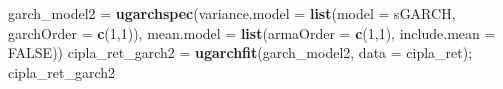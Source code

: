 \documentclass[
]{article}
\newenvironment{Shaded}{\begin{snugshade}}{\end{snugshade}}
\newcommand{\AttributeTok}[1]{\textcolor[rgb]{0.13,0.29,0.53}{#1}}
\newcommand{\ConstantTok}[1]{\textcolor[rgb]{0.56,0.35,0.01}{#1}}
\newcommand{\DecValTok}[1]{\textcolor[rgb]{0.00,0.00,0.81}{#1}}
\newcommand{\FunctionTok}[1]{\textcolor[rgb]{0.13,0.29,0.53}{\textbf{#1}}}
\newcommand{\NormalTok}[1]{#1}
\newcommand{\OtherTok}[1]{\textcolor[rgb]{0.56,0.35,0.01}{#1}}
\newcommand{\StringTok}[1]{\textcolor[rgb]{0.31,0.60,0.02}{#1}}
\begin{document}
\begin{Shaded}
\begin{Highlighting}[]
\NormalTok{garch\_model2 }\OtherTok{=} \FunctionTok{ugarchspec}\NormalTok{(}\AttributeTok{variance.model =} \FunctionTok{list}\NormalTok{(}\AttributeTok{model =} \StringTok{\textquotesingle{}sGARCH\textquotesingle{}}\NormalTok{, }\AttributeTok{garchOrder =} \FunctionTok{c}\NormalTok{(}\DecValTok{1}\NormalTok{,}\DecValTok{1}\NormalTok{)), }\AttributeTok{mean.model =} \FunctionTok{list}\NormalTok{(}\AttributeTok{armaOrder =} \FunctionTok{c}\NormalTok{(}\DecValTok{1}\NormalTok{,}\DecValTok{1}\NormalTok{), }\AttributeTok{include.mean =} \ConstantTok{FALSE}\NormalTok{))}
\NormalTok{cipla\_ret\_garch2 }\OtherTok{=} \FunctionTok{ugarchfit}\NormalTok{(garch\_model2, }\AttributeTok{data =}\NormalTok{ cipla\_ret); }
\NormalTok{cipla\_ret\_garch2}
\end{Highlighting}
\end{Shaded}
\end{document}
